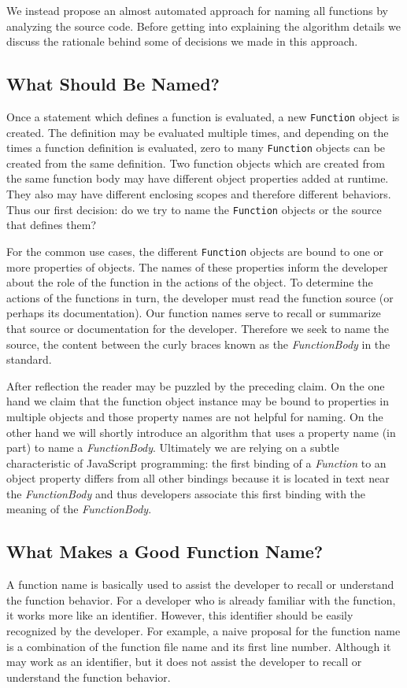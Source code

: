 \documentclass[10pt, preprint]{sigplanconf}
\begin{document}
We instead propose an almost automated approach for naming all functions by analyzing the source code. Before getting into explaining the algorithm details we discuss the rationale behind some of decisions we made in this approach.

\subsection{What Should Be Named?}

Once a statement which defines a function is evaluated, a new {\small\texttt{Function}} 
object is created.  The definition may be evaluated multiple times, and depending on the times a function definition is evaluated, 
zero to many {\small\texttt{Function}} objects can be created from the same definition. 
Two function objects which are created from the same function body may have different object properties added at runtime. They also may have different enclosing scopes and therefore different behaviors.  Thus our first 
decision: do we try to name the {\small\texttt{Function}} objects or the source that defines them?

For the common use cases, the different {\small\texttt{Function}} objects are bound to one or more properties of objects. The  names of these properties inform the developer about the role of the function in the actions of the object.  To determine the actions of the functions in turn, the developer must read the function source (or perhaps its documentation). Our function names serve to recall or summarize that source or documentation for the developer. Therefore we seek to name the source, the content between the curly braces known as the {\textit{FunctionBody}} in the standard\cite{ECMA}.

After reflection the reader may be puzzled by the preceding claim. On the one hand we claim that the function object instance may be bound to properties in multiple objects and those property names are not helpful for naming. On the other hand we will shortly introduce an algorithm that uses a property name (in part) to name a {\textit{FunctionBody}}. Ultimately we are relying on a subtle characteristic of JavaScript programming: the first binding of a {\textit{Function}}  to an object property differs from all other bindings because it is located in text near the {\textit{FunctionBody}} and thus developers associate this first binding with the meaning of the {\textit{FunctionBody}}. 

\subsection{What Makes a Good Function Name?}
A function name is basically used to assist the developer to recall or understand the function behavior. For a developer who is already familiar with the function, it works more like an identifier. However, this identifier should be easily recognized by the developer. For example, a naive proposal for the function name is a combination of the function file name and its first line number. Although it may work as an identifier, but it does not assist the developer to recall or understand the function behavior.
\end{document}
